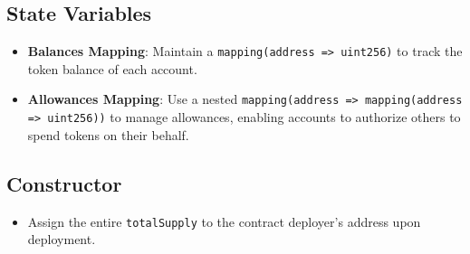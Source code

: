 \documentclass[12pt]{article}
\begin{document}
\subsection*{State Variables}
\begin{itemize}
  \item \textbf{Balances Mapping}: Maintain a \texttt{mapping(address => uint256)} to track the token balance of each account.
  \item \textbf{Allowances Mapping}: Use a nested \texttt{mapping(address => mapping(address => uint256))} to manage allowances, enabling accounts to authorize others to spend tokens on their behalf.
\end{itemize}

\subsection*{Constructor}
\begin{itemize}
  \item Assign the entire \texttt{totalSupply} to the contract deployer's address upon deployment.
\end{itemize}
\end{document}
